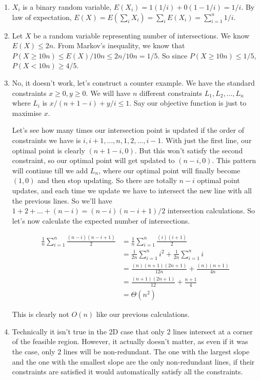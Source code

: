 \documentclass[12pt]{report}
\begin{document}
\begin{enumerate}[label=\textbf{\arabic*.}]
    \item $X_i$ is a binary random variable, $E(X_i) = 1(1/i) + 0(1-1/i) = 1/i$. By law of expectation, $E(X) = E(\sum_i X_i) = 
    \sum_i E(X_i) = \sum_{i=1}^n 1/i$.

    \item Let $X$ be a random variable representing number of intersections. We know $E(X) \leq 2n$. From Markov's inequality, we 
    know that $P(X \geq 10n) \leq E(X)/10n \leq 2n/10n = 1/5$. So since $P(X \geq 10n) \leq 1/5$, $P(X < 10n) \geq 4/5$.

    \item No, it doesn't work, let's construct a counter example. We have the standard constraints $x \geq 0, y \geq 0$. We will 
    have $n$ different constraints $L_1, L_2, \dots, L_n$ where $L_i$ is $x/(n+1-i) + y/i \leq 1$. Say our objective function is 
    just to maximise $x$.

    Let's see how many times our intersection point is updated if the order of constraints we have is $i, i+1, \dots, n, 1, 2,
    \dots, i-1$. With just the first line, our optimal point is clearly $(n+1-i, 0)$. But this won't satisfy the second
    constraint, so our optimal point will get updated to $(n-i, 0)$. This pattern will continue till we add $L_n$, where our
    optimal point will finally become $(1,0)$ and then stop updating. So there are totally $n-i$ optimal point updates, and 
    each time we update we have to intersect the new line with all the previous lines. So we'll have $1 + 2 + \dots + (n-i)
    = (n-i)(n-i+1)/2$ intersection calculations. So let's now calculate the expected number of intersections.

    \begin{align*}
        \frac{1}{n} \sum_{i=1}^{n} \frac{(n-i)(n-i+1)}{2} &= \frac{1}{n} \sum_{i=1}^{n} \frac{(i)(i+1)}{2} \\
        &= \frac{1}{2n} \sum_{i=1}^{n} i^2 + \frac{1}{2n} \sum_{i=1}^{n} i \\
        &= \frac{(n)(n+1)(2n+1)}{12n} + \frac{(n)(n+1)}{4n} \\
        &= \frac{(n+1)(2n+1)}{12} + \frac{n+1}{4} \\
        &= \Theta(n^2)
    \end{align*}

    This is clearly not $O(n)$ like our previous calculations.

    \item Technically it isn't true in the 2D case that only 2 lines intersect at a corner of the feasible region. However, it actually
    doesn't matter, as even if it was the case, only 2 lines will be non-redundant. The one with the largest slope and the one with the 
    smallest slope are the only non-redundant lines, if their constraints are satisfied it would automatically satisfy all the constraints.


\end{enumerate}
\end{document}
